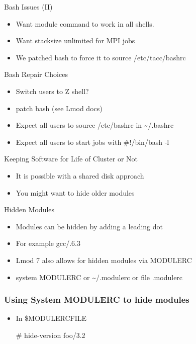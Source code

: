 \documentclass{beamer}
\begin{document}
\begin{frame}{Bash Issues (II)}
  \begin{itemize}
    \item Want module command to work in all shells.
    \item Want stacksize unlimited for MPI jobs
    \item We patched bash to force it to source /etc/tacc/bashrc
  \end{itemize}
\end{frame}

\begin{frame}{Bash Repair Choices}
  \begin{itemize}
    \item Switch users to Z shell?
    \item patch bash (see Lmod docs)
    \item Expect all users to source /etc/bashrc in \textasciitilde/.bashrc
    \item Expect all users to start jobs with \#!/bin/bash -l
  \end{itemize}
\end{frame}

\begin{frame}{Keeping Software for Life of Cluster or Not}
  \begin{itemize}
    \item It is possible with a shared disk approach
    \item You might want to hide older modules
  \end{itemize}
\end{frame}

\begin{frame}{Hidden Modules}
  \begin{itemize}
    \item Modules can be hidden by adding a leading dot
    \item For example gcc/.6.3
    \item Lmod 7 also allows for hidden modules via MODULERC
    \item system MODULERC or \textasciitilde/.modulerc or file .modulerc
  \end{itemize}
\end{frame}

\begin{frame}[fragile]
    \frametitle{Using System MODULERC to hide modules}
  \begin{itemize}
    \item In \$MODULERCFILE
  {\small
    \begin{semiverbatim}
        #%
        hide-version foo/3.2
    \end{semiverbatim}
}
  \end{itemize}
\end{frame}
\end{document}
